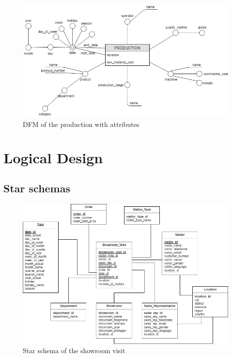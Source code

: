 \documentclass[letterpaper,12pt]{article}
\begin{document}
\begin{figure}[H] 
        \centering
        \includegraphics[width=\columnwidth]{../images/DFM_Production.png}
        \caption{
                \label{fig:productionAttributes}  
                DFM of the production with attributes 
        }
\end{figure}

\section{Logical Design}

\subsection{Star schemas}

\begin{figure}[H] 
        \centering
        \includegraphics[width=\columnwidth]{../images/Starschema_Showroom_visit.png}
        \caption{
                \label{fig:starschemaShowroom}  
                Star schema of the showroom visit
        }
\end{figure}
\end{document}
